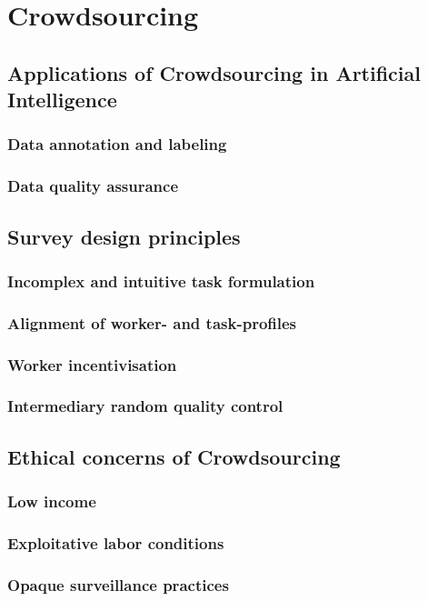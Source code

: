 \chapter{Crowdsourcing}
\label{ch:crowd}

\section{Applications of Crowdsourcing in Artificial Intelligence}
\label{sec:crowd:app}

\subsection{Data annotation and labeling}
\label{sec:crowd:annotation}

\subsection{Data quality assurance}
\label{sec:crowd:quality}


\section{Survey design principles}
\label{sec:crowd:design}

\subsection{Incomplex and intuitive task formulation}
\label{sec:crowd:formulation}

\subsection{Alignment of worker- and task-profiles}
\label{sec:crowd:alignment}

\subsection{Worker incentivisation}
\label{sec:crowd:incentive}

\subsection{Intermediary random quality control}
\label{sec:crowd:control}


\section{Ethical concerns of Crowdsourcing}
\label{sec:crowd:ethic}

\subsection{Low income}
\label{sec:crowd:income}

\subsection{Exploitative labor conditions}
\label{sec:crowd:exploit}

\subsection{Opaque surveillance practices}
\label{sec:crowd:surveillance}